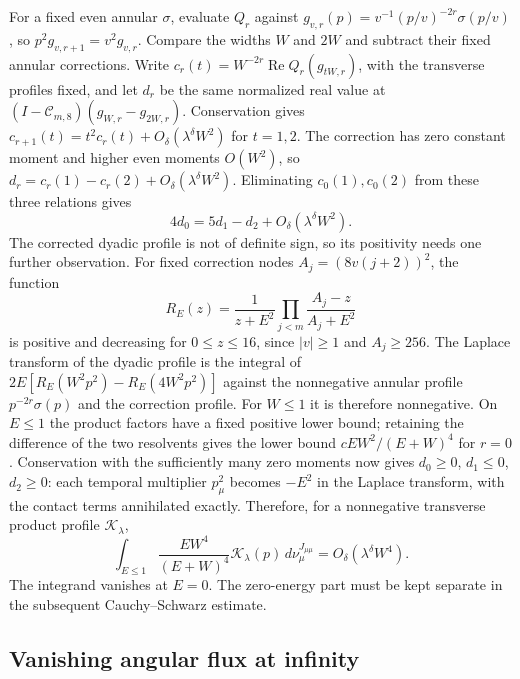 For a fixed even annular $\sigma$, evaluate $Q_r$ against
$g_{v,r}(p)=v^{-1}(p/v)^{-2r}\sigma(p/v)$, so
$p^2g_{v,r+1}=v^2g_{v,r}$. Compare the widths $W$ and $2W$ and
subtract their fixed annular corrections. Write $c_r(t)=W^{-2r}\operatorname{Re}Q_r(g_{tW,r})$, with the
transverse profiles fixed, and let $d_r$ be the same normalized real
value at $(I-\mathcal C_{m,8})(g_{W,r}-g_{2W,r})$.
Conservation gives $c_{r+1}(t)=t^2c_r(t)+O_\delta(\lambda^\delta W^2)$
for $t=1,2$. The correction has zero constant moment and higher even
moments $O(W^2)$, so
$d_r=c_r(1)-c_r(2)+O_\delta(\lambda^\delta W^2)$. Eliminating
$c_0(1),c_0(2)$ from these three relations gives
\[
                  4d_0=5d_1-d_2+O_\delta(\lambda^\delta W^2).
\]
The corrected dyadic profile is not of definite sign, so its positivity needs
one further observation. For fixed correction nodes
$A_j=(8v(j+2))^2$, the function
\[
 R_E(z)=\frac1{z+E^2}\prod_{j<m}\frac{A_j-z}{A_j+E^2}
\]
is positive and decreasing for $0\le z\le16$, since $|v|\ge1$
and $A_j\ge256$. The Laplace transform of the dyadic profile is the integral of
$2E[R_E(W^2p^2)-R_E(4W^2p^2)]$ against the nonnegative
annular profile $p^{-2r}\sigma(p)$ and the correction profile.
For $W\le1$ it is therefore nonnegative. On $E\le1$ the
product factors have a fixed positive lower bound; retaining the
difference of the two resolvents gives the lower bound
$cEW^2/(E+W)^4$ for $r=0$.
Conservation with the sufficiently many zero moments now gives
$d_0\ge0$, $d_1\le0$, $d_2\ge0$: each temporal multiplier
$p_\mu^2$ becomes $-E^2$ in the Laplace transform, with the
contact terms annihilated exactly. Therefore, for
a nonnegative transverse product profile $\mathcal K_\lambda$,
\begin{equation}\label{ch14:diagonal-mass}
 \int_{E\le1}\frac{EW^4}{(E+W)^4}\mathcal K_\lambda(p)
                         \,d\nu_\mu^{J_{\mu\mu}}
                  =O_\delta(\lambda^\delta W^4).
\end{equation}
The integrand vanishes at $E=0$. The zero-energy part must be kept
separate in the subsequent Cauchy--Schwarz estimate.

\subsection{Vanishing angular flux at infinity}
\label{ch14:collinear}

